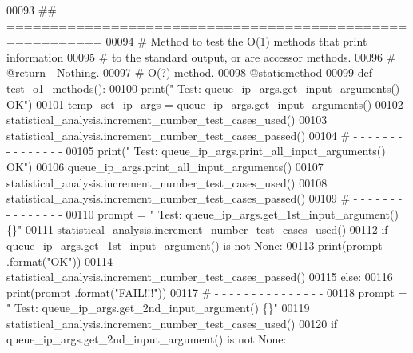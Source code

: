 \begin{DoxyCode}
00093     \textcolor{comment}{## =========================================================}
00094     \textcolor{comment}{#   Method to test the O(1) methods that print information}
00095     \textcolor{comment}{#       to the standard output, or are accessor methods.}
00096     \textcolor{comment}{#   @return - Nothing.}
00097     \textcolor{comment}{#   O(?) method.}
00098     @staticmethod
\hypertarget{queue__ip__arguments__tester_8py_source_l00099}{}\hyperlink{classutilities_1_1queue__ip__arguments__tester_1_1queue__ip__args__tester_a49bd049dbf616cc1f604d3c0cbe84c43}{00099}     \textcolor{keyword}{def }\hyperlink{classutilities_1_1queue__ip__arguments__tester_1_1queue__ip__args__tester_a49bd049dbf616cc1f604d3c0cbe84c43}{test\_o1\_methods}():
00100         print(\textcolor{stringliteral}{" Test: queue\_ip\_args.get\_input\_arguments()       OK"})
00101         temp\_set\_ip\_args = queue\_ip\_args.get\_input\_arguments()
00102         statistical\_analysis.increment\_number\_test\_cases\_used()
00103         statistical\_analysis.increment\_number\_test\_cases\_passed()
00104         \textcolor{comment}{#   -   -   -   -   -   -   -   -   -   -   -   -   -   -   -}
00105         print(\textcolor{stringliteral}{" Test: queue\_ip\_args.print\_all\_input\_arguments()     OK"})
00106         queue\_ip\_args.print\_all\_input\_arguments()
00107         statistical\_analysis.increment\_number\_test\_cases\_used()
00108         statistical\_analysis.increment\_number\_test\_cases\_passed()
00109         \textcolor{comment}{#   -   -   -   -   -   -   -   -   -   -   -   -   -   -   -}
00110         prompt = \textcolor{stringliteral}{"  Test: queue\_ip\_args.get\_1st\_input\_argument()        \{\}"}
00111         statistical\_analysis.increment\_number\_test\_cases\_used()
00112         \textcolor{keywordflow}{if} queue\_ip\_args.get\_1st\_input\_argument() \textcolor{keywordflow}{is} \textcolor{keywordflow}{not} \textcolor{keywordtype}{None}:
00113             print(prompt .format(\textcolor{stringliteral}{"OK"}))
00114             statistical\_analysis.increment\_number\_test\_cases\_passed()
00115         \textcolor{keywordflow}{else}:
00116             print(prompt .format(\textcolor{stringliteral}{"FAIL!!!"}))
00117         \textcolor{comment}{#   -   -   -   -   -   -   -   -   -   -   -   -   -   -   -}
00118         prompt = \textcolor{stringliteral}{"  Test: queue\_ip\_args.get\_2nd\_input\_argument()        \{\}"}
00119         statistical\_analysis.increment\_number\_test\_cases\_used()
00120         \textcolor{keywordflow}{if} queue\_ip\_args.get\_2nd\_input\_argument() \textcolor{keywordflow}{is} \textcolor{keywordflow}{not} \textcolor{keywordtype}{None}:

\end{DoxyCode}
